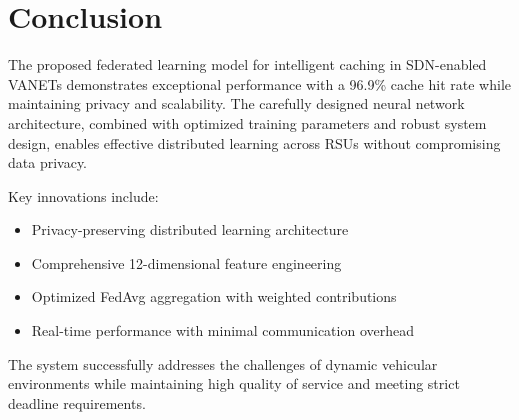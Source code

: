 \documentclass[11pt]{article}
\begin{document}
\section{Conclusion}

The proposed federated learning model for intelligent caching in SDN-enabled VANETs demonstrates exceptional performance with a 96.9\% cache hit rate while maintaining privacy and scalability. The carefully designed neural network architecture, combined with optimized training parameters and robust system design, enables effective distributed learning across RSUs without compromising data privacy.

Key innovations include:
\begin{itemize}
    \item Privacy-preserving distributed learning architecture
    \item Comprehensive 12-dimensional feature engineering
    \item Optimized FedAvg aggregation with weighted contributions
    \item Real-time performance with minimal communication overhead
\end{itemize}

The system successfully addresses the challenges of dynamic vehicular environments while maintaining high quality of service and meeting strict deadline requirements.
\end{document}
